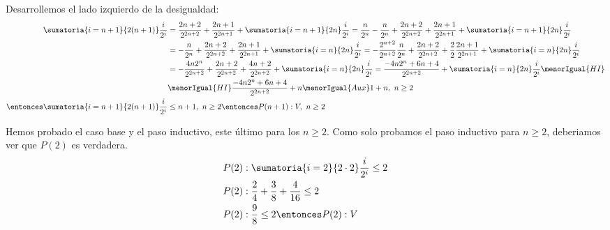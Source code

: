 \begin{enumerate}[label=\roman*)]
\begin{enumerate}[label=\arabic*)]
                Desarrollemos el lado izquierdo de la desigualdad:
                \begin{align*}
                  \sumatoria{i=n+1}{2(n+1)} \frac{i}{2^i}          & = \frac{2n+2}{2^{2n+2}} + \frac{2n+1}{2^{2n+1}}
                  + \sumatoria{i=n+1}{2n} \frac{i}{2^i} = \frac{n}{2^n} - \frac{n}{2^n} + \frac{2n+2}{2^{2n+2}}
                  + \frac{2n+1}{2^{2n+1}} + \sumatoria{i=n+1}{2n} \frac{i}{2^i}                                                                                        \\
                                                               & = - \frac{n}{2^n} + \frac{2n+2}{2^{2n+2}} + \frac{2n+1}{2^{2n+1}} + \sumatoria{i=n}{2n} \frac{i}{2^i}
                  = - \frac{2^{n+2}}{2^{n+2}}\frac{n}{2^n} + \frac{2n+2}{2^{2n+2}} + \frac{2}{2}\frac{2n+1}{2^{2n+1}}
                  + \sumatoria{i=n}{2n} \frac{i}{2^i}                                                                                                                  \\
                                                               & = - \frac{4n 2^n}{2^{2n+2}} + \frac{2n+2}{2^{2n+2}} + \frac{4n+2}{2^{2n+2}}
                  + \sumatoria{i=n}{2n} \frac{i}{2^i} = \frac{-4n 2^n + 6n + 4}{2^{2n+2}} + \sumatoria{i=n}{2n} \frac{i}{2^i}
                  \menorIgual{HI}                                                                                                                        \\
                                                               & \menorIgual{HI} \frac{-4n 2^n + 6n + 4}{2^{2n+2}} + n
                  \menorIgual{Aux} 1 + n, \ n \geq 2                                                                                                     \\
                  \entonces \sumatoria{i=n+1}{2(n+1)} \frac{i}{2^i} & \leq n + 1, \ n \geq 2 \entonces P(n+1): V, \ n \geq 2
                \end{align*}

        \end{enumerate}

        Hemos probado el caso base y el paso inductivo, este último para los $n \geq 2$. Como solo probamos el paso
        inductivo para $n \geq 2$, deberiamos ver que $P(2)$ es verdadera.
        \begin{align*}
          P(2) & : \sumatoria{i=2}{2 \cdot 2} \frac{i}{2^i} \leq 2     \\
          P(2) & : \frac{2}{4} + \frac{3}{8} + \frac{4}{16} \leq 2 \\
          P(2) & : \frac{9}{8} \leq 2 \entonces P(2): V
        \end{align*}


\end{enumerate}
